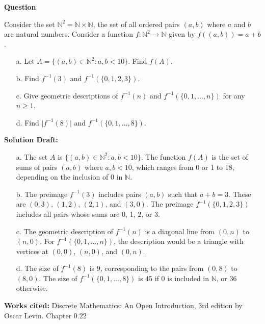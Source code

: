 \documentclass{article}
\begin{document}
\noindent\textbf{Question}

Consider the set \( \mathbb{N}^2 = \mathbb{N} \times \mathbb{N} \), the set of all ordered pairs \( (a, b) \) where \( a \) and \( b \) are natural numbers. Consider a function \( f : \mathbb{N}^2 \rightarrow \mathbb{N} \) given by \( f((a, b)) = a + b \).

\begin{enumerate}
    \item[a.] Let \( A = \{(a, b) \in \mathbb{N}^2 : a, b < 10\} \). Find \( f(A) \).

    \item[b.] Find \( f^{-1}(3) \) and \( f^{-1}(\{0, 1, 2, 3\}) \).

    \item[c.] Give geometric descriptions of \( f^{-1}(n) \) and \( f^{-1}(\{0, 1, \ldots, n\}) \) for any \( n \geq 1 \).

    \item[d.] Find \( \lvert f^{-1}(8) \rvert \) and \( f^{-1}(\{0, 1, \ldots, 8\}) \).
\end{enumerate}

\noindent\textbf{Solution Draft:} 

\begin{enumerate}

\item[a.]
The set \( A \) is \( \{(a, b) \in \mathbb{N}^2 : a, b < 10\} \). The function \( f(A) \) is the set of sums of pairs \( (a, b) \) where \( a, b < 10 \), which ranges from 0 or 1 to 18, depending on the inclusion of 0 in \( \mathbb{N} \).

\item[b.]
The preimage \( f^{-1}(3) \) includes pairs \( (a, b) \) such that \( a + b = 3 \). These are \( (0, 3) \), \( (1, 2) \), \( (2, 1) \), and \( (3, 0) \). The preimage \( f^{-1}(\{0, 1, 2, 3\}) \) includes all pairs whose sums are 0, 1, 2, or 3.

\item[c.]
The geometric description of \( f^{-1}(n) \) is a diagonal line from \( (0, n) \) to \( (n, 0) \). For \( f^{-1}(\{0, 1, \ldots, n\}) \), the description would be a triangle with vertices at \( (0, 0) \), \( (n, 0) \), and \( (0, n) \).

\item[d.]
The size of \( f^{-1}(8) \) is 9, corresponding to the pairs from \( (0, 8) \) to \( (8, 0) \). The size of \( f^{-1}(\{0, 1, \ldots, 8\}) \) is 45 if 0 is included in \( \mathbb{N} \), or 36 otherwise.
\end{enumerate}
\vspace{0.5cm}
\textbf{Works cited:}
Discrete Mathematics: An Open Introduction, 3rd edition by Oscar Levin. Chapter 0.22
\end{document}
